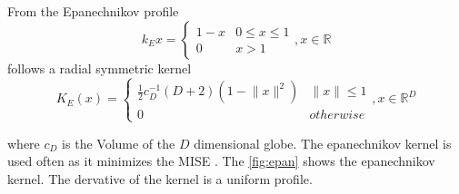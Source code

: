 From the Epanechnikov profile
\begin{equation}\label{eq:epa}
	k_E{x} = \begin{cases}
				1 - x &  0 \leq x \leq 1\\
				0 & x > 1
		\end{cases}, x \in \mathbb{R}
\end{equation}
follows a radial symmetric kernel
\begin{equation}\label{eq:epak}
	K_E(x) = \begin{cases}
				\frac{1}{2}c_D^{-1}(D+2)(1-\lVert x \rVert^2) &  \lVert x \rVert \leq 1 \\
				0 & \mathit{otherwise}
		\end{cases}, x \in \mathbb{R}^D
\end{equation}
 
where $c_D$ is the Volume of the $D$ dimensional globe. The epanechnikov kernel
is used often as it minimizes the \gls{MISE} \citep{citeulike:5813637}. The
\autoref{fig:epan} shows the epanechnikov kernel. The dervative of the 
kernel is a uniform profile.



